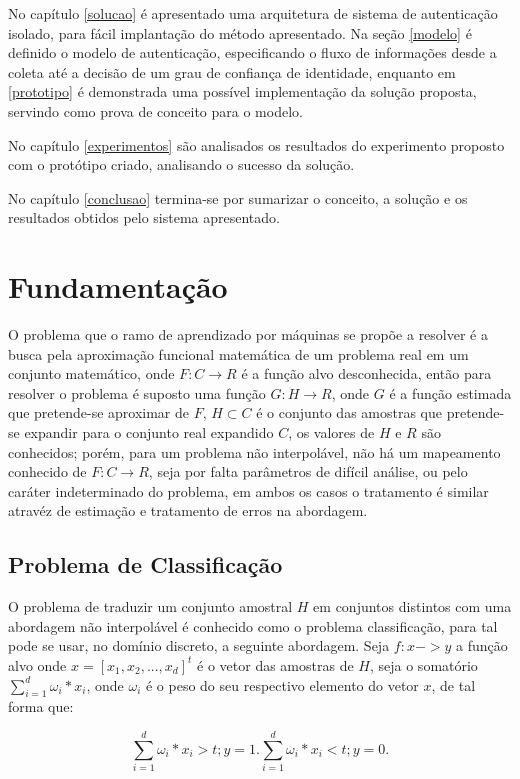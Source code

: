 \documentclass[pfc]{imetex}
\begin{document}
No capítulo \ref{solucao} é apresentado uma arquitetura de sistema de autenticação isolado, para fácil implantação do método apresentado. Na seção \ref{modelo} é definido o modelo de autenticação, especificando o fluxo de informações desde a coleta até a decisão de um grau de confiança de identidade, enquanto em \ref{prototipo} é demonstrada uma possível implementação da solução proposta, servindo como prova de conceito para o modelo.

No capítulo \ref{experimentos} são analisados os resultados do experimento proposto com o protótipo criado, analisando o sucesso da solução.

No capítulo \ref{conclusao} termina-se por sumarizar o conceito, a solução e os resultados obtidos pelo sistema apresentado.

\chapter{Fundamentação}
   O problema que o ramo de aprendizado por máquinas se propõe a resolver é a busca pela aproximação funcional matemática de um problema real em um conjunto matemático, onde $F:C \rightarrow R$ é a função alvo desconhecida, então para resolver o problema é suposto uma função $G:H \rightarrow R$, onde $G$ é a função estimada que pretende-se aproximar de $F$, $H \subset C$ é o conjunto das amostras que pretende-se expandir para o conjunto real expandido $C$, os valores de $H$ e $R$ são conhecidos; porém, para um problema não interpolável, não há um mapeamento conhecido de $F:C \rightarrow R$, seja por falta parâmetros de difícil análise, ou pelo caráter indeterminado do problema, em ambos os casos o tratamento é similar atravéz de estimação e tratamento de erros na abordagem.

\section{Problema de Classificação}

    O problema de traduzir um conjunto amostral $H$ em conjuntos distintos com uma abordagem não interpolável é conhecido como o problema classificação, para tal pode se usar, no domínio discreto, a seguinte abordagem. Seja $f: x->y$ a função alvo onde $x = [x_1,x_2,...,x_d]^t$ é o vetor das amostras de $H$, seja o somatório $\sum\limits_{i=1}^d \omega_i*x_i$, onde $\omega_i$ é o peso do seu respectivo elemento do vetor $x$, de tal forma que:

    \begin{equation}
        \sum\limits_{i=1}^d \omega_i*x_i>t; y = 1.
        \sum\limits_{i=1}^d \omega_i*x_i<t; y = 0.
    \end{equation}
\end{document}
